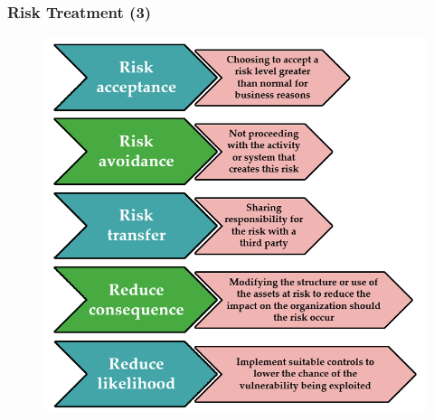 \documentclass[xcolor ={table,usenames,dvipsnames}]{beamer}
\theoremstyle{definition}
\begin{document}
	\begin{frame}
		\frametitle{Risk Treatment (3)}
		\begin{figure}[h!]
			\centering
			\includegraphics[scale=0.25]{img/img_14.PNG}
			\label{Interfacce di un CS}
		\end{figure}
	\end{frame}
	
\end{document}
